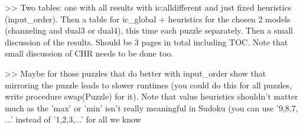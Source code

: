 >> Two tables: one with all results with ic:alldifferent and just fixed heuristics (input\_order). Then a table for ic\_global + heuristics for the chosen 2 models (channeling and dual3 or dual4), this time each puzzle separately. Then a small discussion of the results. Should be 3 pages in total including TOC. Note that small discussion of CHR needs to be done too.

>> Maybe for those puzzles that do better with input\_order show that mirroring the puzzle leads to slower runtimes (you could do this for all puzzles, write procedure swap(Puzzle) for it). Note that value heuristics shouldn't matter much as the 'max' or 'min' isn't  really meaningful in Sudoku (you can use '9,8,7, ...' instead of '1,2,3,...' for all we know

